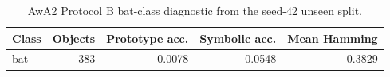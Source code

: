 \begin{table}[H]
\caption{AwA2 Protocol B bat-class diagnostic from the seed-42 unseen split.\label{tab:bat_diagnostic}}
\centering
\small
\begin{tabular}{lrrrr}
\toprule
Class & Objects & Prototype acc. & Symbolic acc. & Mean Hamming \\
\midrule
bat & 383 & 0.0078 & 0.0548 & 0.3829 \\
\bottomrule
\end{tabular}
\end{table}
